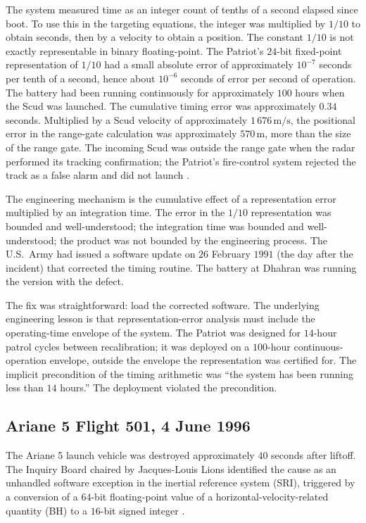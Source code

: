 The system measured time as an integer count of tenths of a second elapsed since boot. To use this in the targeting equations, the integer was multiplied by $1/10$ to obtain seconds, then by a velocity to obtain a position. The constant $1/10$ is not exactly representable in binary floating-point. The Patriot's $24$-bit fixed-point representation of $1/10$ had a small absolute error of approximately $10^{-7}$ seconds per tenth of a second, hence about $10^{-6}$ seconds of error per second of operation. The battery had been running continuously for approximately $100$ hours when the Scud was launched. The cumulative timing error was approximately $0.34$ seconds. Multiplied by a Scud velocity of approximately $1\,676\,\si{\meter\per\second}$, the positional error in the range-gate calculation was approximately $570\,\si{\meter}$, more than the size of the range gate. The incoming Scud was outside the range gate when the radar performed its tracking confirmation; the Patriot's fire-control system rejected the track as a false alarm and did not launch \cite{acc:gao-patriot-1992}.

The engineering mechanism is the cumulative effect of a representation error multiplied by an integration time. The error in the $1/10$ representation was bounded and well-understood; the integration time was bounded and well-understood; the product was not bounded by the engineering process. The U.S.\ Army had issued a software update on $26$ February $1991$ (the day after the incident) that corrected the timing routine. The battery at Dhahran was running the version with the defect.

The fix was straightforward: load the corrected software. The underlying engineering lesson is that representation-error analysis must include the operating-time envelope of the system. The Patriot was designed for $14$-hour patrol cycles between recalibration; it was deployed on a $100$-hour continuous-operation envelope, outside the envelope the representation was certified for. The implicit precondition of the timing arithmetic was ``the system has been running less than $14$ hours.'' The deployment violated the precondition.

\subsection{Ariane 5 Flight 501, 4 June 1996}

The Ariane 5 launch vehicle was destroyed approximately $40$ seconds after liftoff. The Inquiry Board chaired by Jacques-Louis Lions identified the cause as an unhandled software exception in the inertial reference system (SRI), triggered by a conversion of a $64$-bit floating-point value of a horizontal-velocity-related quantity (BH) to a $16$-bit signed integer \cite{acc:ariane501-ifr}.


